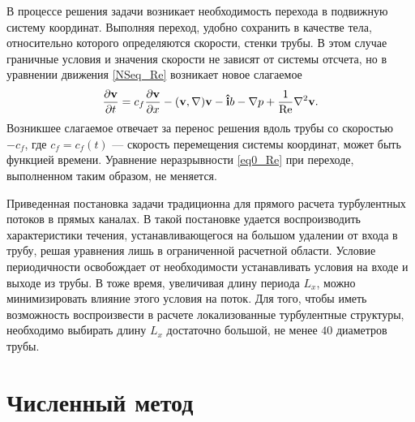 В процессе решения задачи возникает необходимость перехода в подвижную систему координат. Выполняя переход, удобно сохранить в качестве тела, относительно которого определяются скорости, стенки трубы. В этом случае граничные условия и значения скорости не зависят от системы отсчета, но в уравнении движения \eqref{NSeq_Re} возникает новое слагаемое
\begin{equation}\label{NSeq_cf}
\frac{\partial \mathbf{v}}{\partial t} = c_f \frac{\partial \mathbf{v}}{\partial x} - (\mathbf{v}, \nabla) \mathbf{v} - \mathbf{\hat{i}} b - \nabla p + \frac{1}{\operatorname{Re}} \nabla^2 \mathbf{v}. 
\end{equation}
Возникшее слагаемое отвечает за перенос решения вдоль трубы со скоростью $-c_f$, где $c_f = c_f(t)$ --- скорость перемещения системы координат, может быть функцией времени. Уравнение неразрывности \eqref{eq0_Re} при переходе, выполненном таким образом, не меняется. 

Приведенная постановка задачи традиционна для прямого расчета турбулентных потоков в прямых каналах. В такой постановке удается воспроизводить характеристики течения, устанавливающегося на большом удалении от входа в трубу, решая уравнения лишь в ограниченной расчетной области. Условие периодичности освобождает от необходимости устанавливать условия на входе и выходе из трубы. В тоже время, увеличивая длину периода $L_x$, можно минимизировать влияние этого условия на поток. Для того, чтобы иметь возможность воспроизвести в расчете локализованные турбулентные структуры, необходимо выбирать длину $L_x$ достаточно большой, не менее $40$ диаметров трубы. 


\section{Численный метод} \label{num_method}

\begin{comment}
Поставленная задача решается численно конечно-разностным методом \cite{nikitin2006method}. Метод формулируется относительно уравнения движения \eqref{NSeq_Re}, преобразованного к виду 
\begin{equation}\label{NSeq_om}
\pd{\v}{t} = - \i b + \v \times \om - \nabla P - \frac{1}{\Re} \rot \om
\end{equation}
Здесь $\om = \rot \v$ --- вектор завихренности, посчитанный по полю скорости $\v$, $P = p + |\v|^2/2$ --- полное кинематическое давление. Эквивалентность уравнений \eqref{NSeq_Re} и \eqref{NSeq_om} следует из векторных тождеств
\begin{equation*}
-(\v, \nabla) \v = \v \times \rot \v - \nabla |\v|^2/2,
\end{equation*}
\begin{equation*}
\nabla^2 \v = \grad \div \v - \rot \rot \v.
\end{equation*}
\end{comment}

